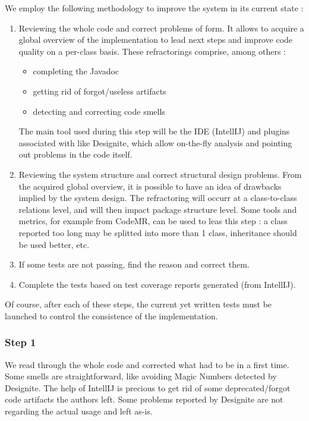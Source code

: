 \documentclass[]{article}
\begin{document}
We employ the following methodology to improve the system in its current state :
\begin{enumerate}
\item Reviewing the whole code and correct problems of form. It allows to acquire a global overview of the implementation to lead next steps and improve code quality on a per-class basis. These refractorings comprise, among others :
\begin{itemize}
\item completing the Javadoc
\item getting rid of forgot/useless artifacts
\item detecting and correcting code smells
\end{itemize}
The main tool used during this step will be the IDE (IntellIJ) and plugins associated with like Designite, which allow on-the-fly analysis and pointing out problems in the code itself.


\item Reviewing the system structure and correct structural design problems. From the acquired global overview, it is possible to have an idea of drawbacks implied by the system design. The refractoring will occurr at a class-to-class relations level, and will then impact package structure level. Some tools and metrics, for example from CodeMR, can be used to leas this step : a class reported too long may be splitted into more than 1 class, inheritance should be used better, etc.

\item If some tests are not passing, find the reason and correct them.

\item Complete the tests based on test coverage reports generated (from IntellIJ).
 
\end{enumerate}
\vspace{0.2cm}
Of course, after each of these steps, the current yet written tests must be launched to control the consistence of the implementation.

\subsubsection{Step 1}

\indent\par We read through the whole code and corrected what had to be in a first time. Some smells are straightforward, like avoiding Magic Numbers detected by Designite. The help of IntellIJ is precious to get rid of some deprecated/forgot code artifacts the authors left. Some problems reported by Designite are not regarding the actual usage and left as-is.
\end{document}
